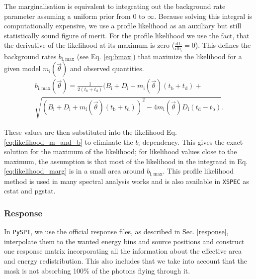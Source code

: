 \documentclass[twocolumn,traditabstract]{aa}
\begin{document}
\noindent
The marginalisation is equivalent to integrating out the background rate parameter assuming a uniform prior from 0 to $\infty$. Because solving this integral is computationally expensive, we use a profile likelihood as an auxiliary but still statistically sound figure of merit. For the profile likelihood we use the fact, that the derivative of the likelihood at its maximum is zero ($\frac{\textrm{dL}}{\textrm{db}_i}=0$). This defines the background rates $b_\mathrm{{i, max}}$ (see Eq. \ref{eq:bmax}) that maximize the likelihood for a given model $m_{\mathrm{i}}(\vec{\theta})$ and observed quantities.
\begin{multline}
	b_{\mathrm{i,max}}(\vec{\theta})=\frac{1}{2(t_{\mathrm{b}}+t_{\mathrm{d}})}(B_{\mathrm{i}}+D_{\mathrm{i}}-m_{\mathrm{i}}(\vec{\theta})(t_{\mathrm{b}}+t_{\mathrm{d}})+\\
  \sqrt{(B_{\mathrm{i}}+D_{\mathrm{i}}+m_{\mathrm{i}}(\vec{\theta})(t_{\mathrm{b}}+t_{\mathrm{d}}))^{2}-4m_{\mathrm{i}}(\vec{\theta})D_{\mathrm{i}}(t_{\mathrm{d}}-t_{\mathrm{b}})}.
  \label{eq:bmax}
\end{multline}

\noindent
These values are then substituted into the likelihood Eq. \ref{eq:likelihood_m_and_b} to eliminate the $b_{\mathrm{i}}$ dependency. This gives the exact solution for the maximum of the likelihood; for likelihood values close to the maximum, the assumption is that most of the likelihood in the integrand in Eq. \ref{eq:likelihood_marg} is in a small area around $b_{\mathrm{i,max}}$.
This profile likelihood method is used in many spectral analysis works \citep[e.g.][]{profile2, profile1} and is also available in {\tt XSPEC} \citep{xspec} as cstat and pgstat.

\subsubsection{Response}

In {\tt PySPI}, we use the official response files, as described in Sec. \ref{response}, interpolate them to the wanted energy bins and source positions and construct one response matrix incorporating all the information about the effective area and energy redistribution. This also includes that we take into account that the mask is not absorbing 100\% of the photons flying through it.
\end{document}
